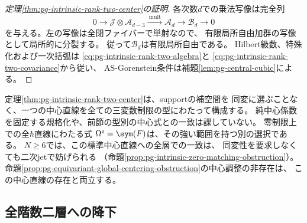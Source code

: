 \begin{proof}[定理\ref{thm:pg-intrinsic-rank-two-center}の証明]
各次数$d$での乗法写像は完全列
\begin{equation}
 0\longrightarrow\mathcal J\otimes\mathcal A_{d-3}
 \xrightarrow{\ \mathrm{mult}\ }\mathcal A_d
 \longrightarrow\mathcal B_d\longrightarrow0
 \label{eq:pg-intrinsic-rank-two-flat-quotient-sequence}
\end{equation}
を与える。左の写像は全閉ファイバーで単射なので、
有限局所自由加群の写像として局所的に分裂する。
従って$\mathcal B_d$は有限局所自由である。
Hilbert級数、特殊化および一次括弧は
\eqref{eq:pg-intrinsic-rank-two-algebra}と
\eqref{eq:pg-intrinsic-rank-two-covariance}から従い、
AS-Gorenstein条件は補題\ref{lem:pg-central-cubic}による。
\end{proof}

\begin{remark}[型別の選択と大域的選択]
\label{rem:pg-intrinsic-rank-two-choice}
定理\ref{thm:pg-intrinsic-rank-two-center}は、supportの補空間を
同変に選ぶことなく、一つの中心直線を全ての三変数制限の型にわたって構成する。
純中心係数を固定する規格化や、前節の型別の中心式との一致は課していない。
零制限上での全$\hbar$直線にわたる式
$\Omega^{\mathrm z}=\sym(F)$は、その強い範囲を持つ別の選択である。
$N\ge6$では、この標準中心直線への全層での一致は、
同変性を要求しなくても二次jetで妨げられる
（命題\ref{prop:pg-intrinsic-zero-matching-obstruction}）。
命題\ref{prop:pg-equivariant-global-centering-obstruction}の中心調整の非存在は、
この中心直線の存在と両立する。
\end{remark}

\subsection{全階数二層への降下}

